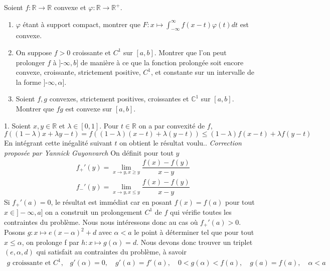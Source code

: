 \documentclass{fancybook}
\begin{document}
\begin{exercice}
Soient $f:\mathbb R \to \mathbb R$ convexe et $\varphi:\mathbb R\to \mathbb R^+$.
\begin{enumerate}
\item $\varphi$ étant à support compact, montrer que $F:x\mapsto \int_{-\infty}^{\infty} f(x-t)\varphi(t)dt$ est convexe.
\item On suppose $f>0$ croissante et $C^1$ sur $[a,b]$.\newline
Montrer que l'on peut prolonger $f$ à $]\text{-}\infty, b]$ de manière à ce que la fonction prolongée soit encore convexe, croissante, strictement positive, $C^1$, et constante sur un intervalle de la forme $]\text{-}\infty, \alpha]$.
\item Soient $f,g$ convexes, strictement positives, croissantes et $\mathbb C^1$ sur $[a,b]$. Montrer que $fg$ est convexe sur $[a,b]$.
\end{enumerate} 
\end{exercice}
1. Soient $x,y\in \mathbb R$ et $\lambda \in [0,1]$. Pour $t\in \mathbb R$ on a par convexité de $f$, $$f((1-\lambda)x + \lambda y -t)=f((1-\lambda)(x-t) + \lambda(y-t))\leq (1-\lambda)f(x-t) + \lambda f(y-t)$$
En intégrant cette inégalité suivant $t$ on obtient le résultat voulu.\newline {}. \hfill \textit{Correction proposée par Yannick Guyonvarch}\newline
On définit pour tout $y$
\begin{align*}
    &f_+'(y)=\lim_{x\to y,x\geq y}\dfrac{f(x)-f(y)}{x-y} \\
    &f_-'(y)=\lim_{x\to y,x\leq y}\dfrac{f(x)-f(y)}{x-y}
\end{align*}\newline 
Si $f_+'(a)=0$, le résultat est immédiat car en posant $f(x)=f(a)$ pour tout $x\in]-\infty,a]$ on a construit un prolongement $C^1$ de $f$ qui vérifie toutes les contraintes du problème.\newline \newline
Nous nous intéressons donc au cas où $f_+'(a)>0$. Posons $g:x\mapsto e(x-\alpha)^2+d$ avec $\alpha<a$ le point à déterminer tel que pour tout $x\leq\alpha$, on prolonge f par $h:x\mapsto g(\alpha)=d$. Nous devons donc trouver un triplet $(e,\alpha,d)$ qui satisfait au contraintes du problème, à savoir
\begin{align*}
    g\text{ croissante et $C^1$,}\quad g'(\alpha)=0,\quad g'(a)=f'(a),\quad 0<g(\alpha)<f(a),\quad g(a)=f(a),\quad \alpha<a
\end{align*}
\end{document}
